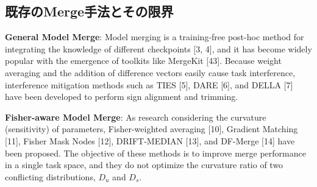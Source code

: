 \documentclass{article}
\begin{document}
\subsection{既存のMerge手法とその限界}




\textbf{General Model Merge}: Model merging is a training-free post-hoc method for integrating the knowledge of different checkpoints [3, 4], and it has become widely popular with the emergence of toolkits like MergeKit [43]. Because weight averaging and the addition of difference vectors easily cause task interference, interference mitigation methods such as TIES [5], DARE [6], and DELLA [7] have been developed to perform sign alignment and trimming.

\textbf{Fisher-aware Model Merge}: As research considering the curvature (sensitivity) of parameters, Fisher-weighted averaging [10], Gradient Matching [11], Fisher Mask Nodes [12], DRIFT-MEDIAN [13], and DF-Merge [14] have been proposed. The objective of these methods is to improve merge performance in a single task space, and they do not optimize the curvature ratio of two conflicting distributions, $D_u$ and $D_s$.
\end{document}
